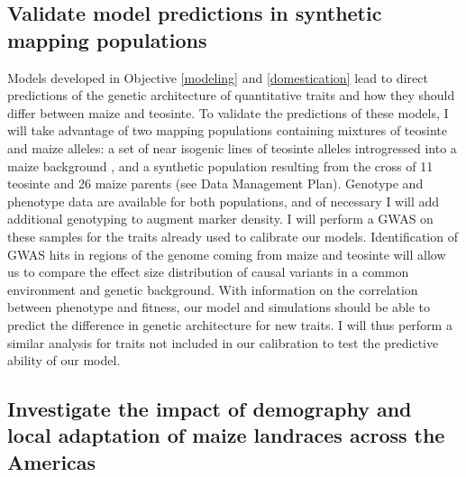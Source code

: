 
\subsection{Validate model predictions in synthetic mapping populations}
\label{validation}

Models developed in Objective \ref{modeling} and \ref{domestication} lead to direct predictions of the genetic architecture of quantitative traits and how they should differ between maize and teosinte. To validate the predictions of these models, I will take advantage of two mapping populations containing mixtures of teosinte and maize alleles: a set of near isogenic lines of teosinte alleles introgressed into a maize background \citep{Liu:InPress}, and a synthetic population resulting from the cross of 11 teosinte and 26 maize parents (see Data Management Plan). Genotype and phenotype data are available for both populations, and of necessary I will add additional genotyping to augment marker density.
I will perform a GWAS on these samples for the traits already used to calibrate our models. Identification of GWAS hits in regions of the genome coming from maize and teosinte will allow us to compare the effect size distribution of causal variants in a common environment and genetic background. With information on the correlation between phenotype and fitness, our model and simulations should be able to predict the difference in genetic architecture for new traits. I will thus perform a similar analysis for traits not included in our calibration to test the predictive ability of our model. 

\subsection{Investigate the impact of demography and local adaptation of maize landraces across the Americas} 
\label{surfing}

